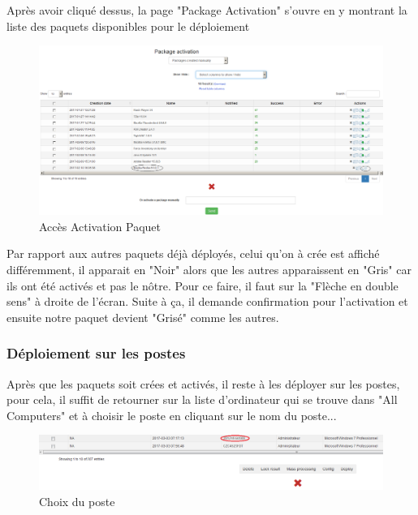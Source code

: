 \documentclass[11pt,a4paper,oneside]{article}
\begin{document}
Après avoir cliqué dessus, la page "Package Activation" s'ouvre en y montrant la liste des paquets disponibles pour le déploiement

\begin{figure}[hbtp]
\centering
\includegraphics[scale=0.4]{Script/Activation2.PNG}
\caption{Accès Activation Paquet}
\end{figure}
 
Par rapport aux autres paquets déjà déployés, celui qu'on à crée est affiché différemment, il apparait en "Noir" alors que les autres apparaissent en "Gris" car ils ont été activés et pas le nôtre. Pour ce faire, il faut sur la "Flèche en double sens" à droite de l'écran. Suite à ça, il demande confirmation pour l'activation et ensuite notre paquet devient "Grisé" comme les autres.
\newpage
\subsubsection{Déploiement sur les postes}
Après que les paquets soit crées et activés, il reste à les déployer sur les postes, pour cela, il suffit de retourner sur la liste d'ordinateur qui se trouve dans "All Computers" et à choisir le poste en cliquant sur le nom du poste...
\begin{figure}[hbtp]
\centering
\includegraphics[scale=0.5]{Script/Act_Deploy1.PNG}
\caption{Choix du poste}
\end{figure}
\end{document}
